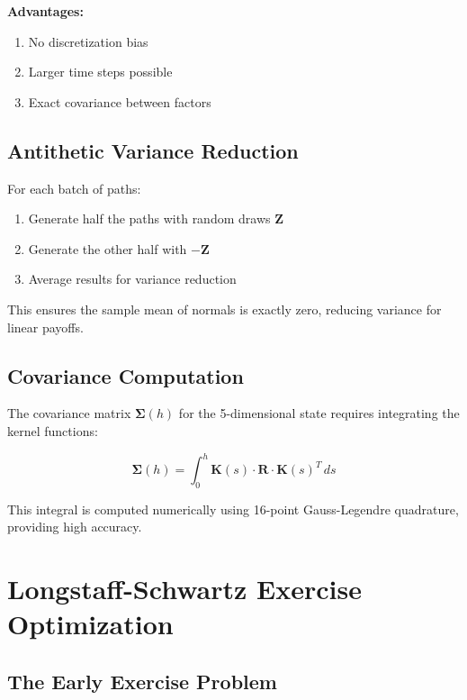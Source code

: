 \documentclass[10pt,a4paper]{article}
\begin{document}
\textbf{Advantages:}
\begin{enumerate}
    \item No discretization bias
    \item Larger time steps possible
    \item Exact covariance between factors
\end{enumerate}

\subsection{Antithetic Variance Reduction}

For each batch of paths:
\begin{enumerate}
    \item Generate half the paths with random draws $\mathbf{Z}$
    \item Generate the other half with $-\mathbf{Z}$
    \item Average results for variance reduction
\end{enumerate}

This ensures the sample mean of normals is exactly zero, reducing variance for linear payoffs.

\subsection{Covariance Computation}

The covariance matrix $\boldsymbol{\Sigma}(h)$ for the 5-dimensional state requires integrating the kernel functions:

\[
\boldsymbol{\Sigma}(h) = \int_0^h \mathbf{K}(s) \cdot \mathbf{R} \cdot \mathbf{K}(s)^T\,ds
\]

This integral is computed numerically using 16-point Gauss-Legendre quadrature, providing high accuracy.

\newpage

\section{Longstaff-Schwartz Exercise Optimization}

\subsection{The Early Exercise Problem}
\end{document}
